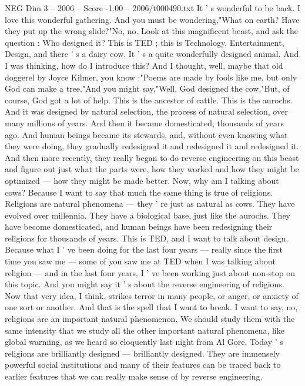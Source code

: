 \begin{textsample}{NEG Dim 3 – 2006 – Score -1.00 – 2006/t000490.txt}  \label{ex:f3_neg_018}
It ' s wonderful to be back.
I love this wonderful gathering.
And you must be wondering,"What on earth?
Have they put up the wrong slide?"No, no.
Look at this magnificent beast, and ask the question : Who designed it?
This is TED ; this is Technology, Entertainment, Design, and there ' s a dairy cow.
It ' s a quite wonderfully designed animal.
And I was thinking, how do I introduce this?
And I thought, well, maybe that old doggerel by Joyce Kilmer, you know :"Poems are made by fools like me, but only God can make a tree."And you might say,"Well, God designed the cow."But, of course, God got a lot of help.
This is the ancestor of cattle.
This is the aurochs.
And it was designed by natural selection, the process of natural selection, over many millions of years.
And then it became domesticated, thousands of years ago.
And human beings became its stewards, and, without even knowing what they were doing, they gradually redesigned it and redesigned it and redesigned it.
And then more recently, they really began to do reverse engineering on this beast and figure out just what the parts were, how they worked and how they might be optimized — how they might be made better.
Now, why am I talking about cows?
Because I want to say that much the same thing is true of religions.
Religions are natural phenomena — they ' re just as natural as cows.
They have evolved over millennia.
They have a biological base, just like the aurochs.
They have become domesticated, and human beings have been redesigning their religions for thousands of years.
This is TED, and I want to talk about design.
Because what I ' ve been doing for the last four years — really since the first time you saw me — some of you saw me at TED when I was talking about religion — and in the last four years, I ' ve been working just about non-stop on this topic.
And you might say it ' s about the reverse engineering of religions.
Now that very idea, I think, strikes terror in many people, or anger, or anxiety of one sort or another.
And that is the spell that I want to break.
I want to say, no, religions are an important natural phenomenon.
We should study them with the same intensity that we study all the other important natural phenomena, like global warming, as we heard so eloquently last night from Al Gore.
Today ' s religions are brilliantly designed — brilliantly designed.
They are immensely powerful social institutions and many of their features can be traced back to earlier features that we can really make sense of by reverse engineering.

\end{textsample}

